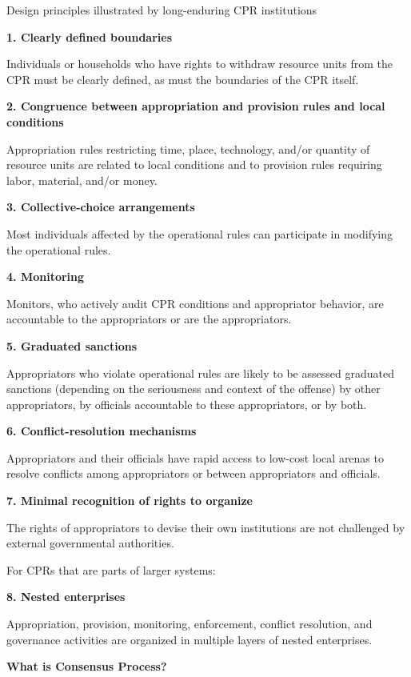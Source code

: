 \documentclass{article}
\begin{document}
Design principles illustrated by long-enduring CPR institutions

\textbf{1. Clearly defined boundaries}

Individuals or households who have rights to withdraw resource units from the CPR must be clearly defined, as must the boundaries of the CPR itself.

\textbf{2. Congruence between appropriation and provision rules and local conditions}

 Appropriation rules restricting time, place, technology, and/or quantity of resource units are related to local conditions and to provision rules requiring labor, material, and/or money.

\textbf{3. Collective-choice arrangements}

Most individuals affected by the operational rules can participate in modifying the operational rules.

\textbf{4. Monitoring}

Monitors, who actively audit CPR conditions and appropriator behavior, are accountable to the appropriators or are the appropriators.

\textbf{5. Graduated sanctions}

Appropriators who violate operational rules are likely to be assessed graduated sanctions (depending on the seriousness and context of the offense) by other appropriators, by officials accountable to these appropriators, or by both.

\textbf{6. Conflict-resolution mechanisms}

Appropriators and their officials have rapid access to low-cost local arenas to resolve conflicts among appropriators or between appropriators and officials.

\textbf{7. Minimal recognition of rights to organize}

The rights of appropriators to devise their own institutions are not challenged by external governmental authorities.

For CPRs that are parts of larger systems:

\textbf{8. Nested enterprises}

Appropriation, provision, monitoring, enforcement, conflict resolution, and governance activities are organized in multiple layers of nested enterprises.





\pagebreak
{\huge \textbf{What is Consensus Process?}}
\end{document}
